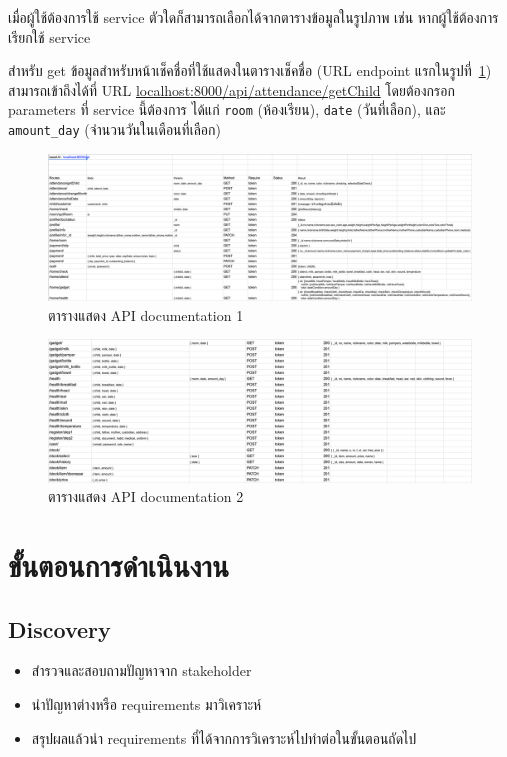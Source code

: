 เมื่อผู้ใช้ต้องการใช้ service ตัวใดก็สามารถเลือกได้จากตารางข้อมูลในรูปภาพ เช่น หากผู้ใช้ต้องการเรียกใช้ service 

สำหรับ get ข้อมูลสำหรับหน้าเช็คชื่อที่ใช้แสดงในตารางเช็คชื่อ (URL endpoint แรกในรูปที่~\ref{fig:ApiDocs1}) 
สามารถเข้าถึงได้ที่ URL \url{localhost:8000/api/attendance/getChild} โดยต้องกรอก parameters ที่ 
service นี้ต้องการ ได้แก่ \texttt{room} (ห้องเรียน), \texttt{date} (วันที่เลือก), และ \texttt{amount\_day} (จำนวนวันในเดือนที่เลือก)

\begin{landscape}
  \begin{figure}
    \begin{center}
      \includegraphics[width=\linewidth]{images/ApiDocOne.png}
    \end{center}
    \caption{ตารางแสดง API documentation 1}
    \label{fig:ApiDocs1}
  \end{figure}

  \begin{figure}
    \begin{center}
      \includegraphics[width=\linewidth]{images/ApiDocTwo.png}
    \end{center}
    \caption{ตารางแสดง API documentation 2}
    \label{fig:ApiDocs2}
  \end{figure}
\end{landscape}

\section{ขั้นตอนการดำเนินงาน}
\subsection{Discovery}
\begin{itemize}
  \item สำรวจและสอบถามปัญหาจาก stakeholder
  \item นำปัญหาต่างหรือ requirements มาวิเคราะห์
  \item สรุปผลแล้วนำ requirements ที่ได้จากการวิเคราะห์ไปทำต่อในขั้นตอนถัดไป
\end{itemize}

